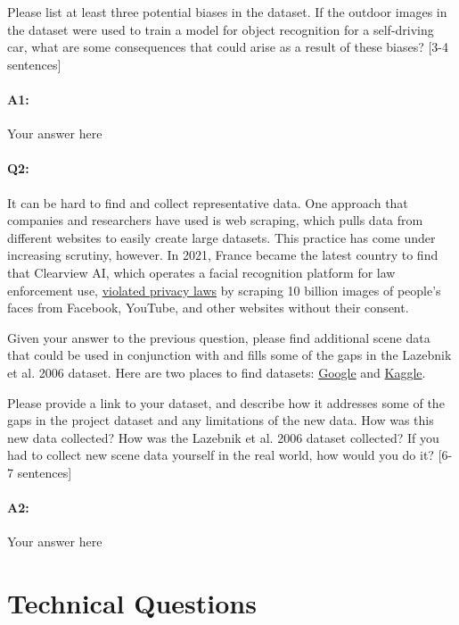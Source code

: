 Please list at least three potential biases in the dataset. If the outdoor images in the dataset were used to train a model for object recognition for a self-driving car, what are some consequences that could arise as a result of these biases? [3-4 sentences]

\paragraph{A1:} Your answer here

\pagebreak

\paragraph{Q2:}  It can be hard to find and collect representative data. One approach that companies and researchers have used is web scraping, which pulls data from different websites to easily create large datasets. This practice has come under increasing scrutiny, however. In 2021, France became the latest country to find that Clearview AI, which operates a facial recognition platform for law enforcement use, \href{https://techcrunch.com/2021/12/16/clearview-gdpr-breaches-france/}{violated privacy laws} by scraping 10 billion images of people's faces from Facebook, YouTube, and other websites without their consent.

Given your answer to the previous question, please find additional scene data that could be used in conjunction with and fills some of the gaps in the Lazebnik et al. 2006 dataset. Here are two places to find datasets: \href{https://datasetsearch.research.google.com}{Google} and \href{https://www.kaggle.com}{Kaggle}. 

Please provide a link to your dataset, and describe how it addresses some of the gaps in the project dataset and any limitations of the new data. How was this new data collected? How was the Lazebnik et al. 2006 dataset collected? If you had to collect new scene data yourself in the real world, how would you do it? [6-7 sentences]

\paragraph{A2:} Your answer here
\pagebreak
\section*{Technical Questions}


